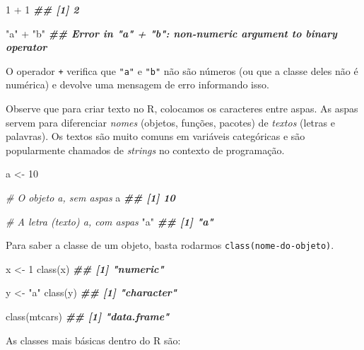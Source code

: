 \documentclass[
]{book}
\newenvironment{Shaded}{\begin{snugshade}}{\end{snugshade}}
\newcommand{\CommentTok}[1]{\textcolor[rgb]{0.56,0.35,0.01}{\textit{#1}}}
\newcommand{\DecValTok}[1]{\textcolor[rgb]{0.00,0.00,0.81}{#1}}
\newcommand{\DocumentationTok}[1]{\textcolor[rgb]{0.56,0.35,0.01}{\textbf{\textit{#1}}}}
\newcommand{\FunctionTok}[1]{\textcolor[rgb]{0.00,0.00,0.00}{#1}}
\newcommand{\NormalTok}[1]{#1}
\newcommand{\OtherTok}[1]{\textcolor[rgb]{0.56,0.35,0.01}{#1}}
\newcommand{\SpecialCharTok}[1]{\textcolor[rgb]{0.00,0.00,0.00}{#1}}
\newcommand{\StringTok}[1]{\textcolor[rgb]{0.31,0.60,0.02}{#1}}
\begin{document}
\begin{Shaded}
\begin{Highlighting}[]
\DecValTok{1} \SpecialCharTok{+} \DecValTok{1}
\DocumentationTok{\#\# [1] 2}


\StringTok{"a"} \SpecialCharTok{+} \StringTok{"b"}
\DocumentationTok{\#\# Error in "a" + "b": non{-}numeric argument to binary operator}
\end{Highlighting}
\end{Shaded}

O operador \texttt{+} verifica que \texttt{"a"} e \texttt{"b"} não são números (ou que a classe deles não é numérica) e devolve uma mensagem de erro informando isso.

Observe que para criar texto no R, colocamos os caracteres entre aspas. As aspas servem para diferenciar \emph{nomes} (objetos, funções, pacotes) de \emph{textos} (letras e palavras). Os textos são muito comuns em variáveis categóricas e são popularmente chamados de \emph{strings} no contexto de programação.

\begin{Shaded}
\begin{Highlighting}[]
\NormalTok{a }\OtherTok{\textless{}{-}} \DecValTok{10}

\CommentTok{\# O objeto \textasciigrave{}a\textasciigrave{}, sem aspas}
\NormalTok{a}
\DocumentationTok{\#\# [1] 10}

\CommentTok{\# A letra (texto) \textasciigrave{}a\textasciigrave{}, com aspas}
\StringTok{"a"}
\DocumentationTok{\#\# [1] "a"}
\end{Highlighting}
\end{Shaded}

Para saber a classe de um objeto, basta rodarmos \texttt{class(nome-do-objeto)}.

\begin{Shaded}
\begin{Highlighting}[]
\NormalTok{x }\OtherTok{\textless{}{-}} \DecValTok{1}
\FunctionTok{class}\NormalTok{(x)}
\DocumentationTok{\#\# [1] "numeric"}

\NormalTok{y }\OtherTok{\textless{}{-}} \StringTok{"a"}
\FunctionTok{class}\NormalTok{(y)}
\DocumentationTok{\#\# [1] "character"}

\FunctionTok{class}\NormalTok{(mtcars)}
\DocumentationTok{\#\# [1] "data.frame"}
\end{Highlighting}
\end{Shaded}

As classes mais básicas dentro do R são:
\end{document}
